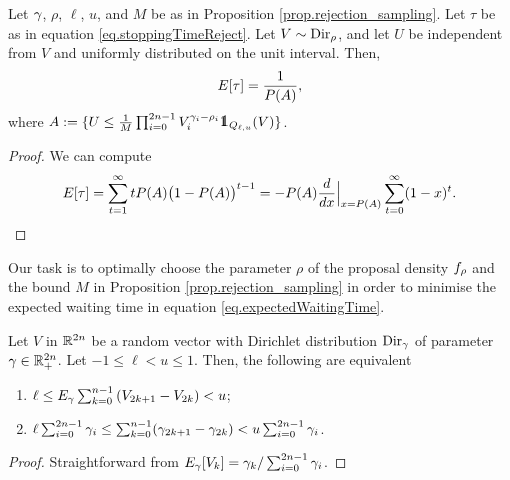 \documentclass[10pt, article,table]{article}
\begin{document}
\begin{prop}\label{prop.expectedWaitingTime}
 Let $\dirparam$, $\rho$, $\ell$, $u$, and $M$ be as in Proposition \ref{prop.rejection_sampling}. Let $\tau$ be as in equation \eqref{eq.stoppingTimeReject}.  Let $V\sim\dirichlet[\rho]$, and let $U$ be independent from $V$ and uniformly distributed on the unit interval.
 Then, 
 \begin{equation}\label{eq.expectedWaitingTime}
  \Expectation[\tau]
  =
  \frac{1}{\Prob(A)},
 \end{equation}
where $A:=\lbrace U\leq \frac{1}{M}\prod_{i=0}^{2n-1}V_{i}^{\dirparam_i - \rho_i}\one_{Q\subscriptellu}(V)\rbrace$.
\end{prop}
\begin{proof}
We can compute
 \begin{equation*}
  \Expectation[\tau]
  =
  \sum_{t=1}^{\infinity}t\Prob(A)\big(1-\Prob(A)\big)^{t-1}
  =
  -\Prob(A)\frac{d}{dx}\Big\vert_{x=\Prob(A)} \sum_{t=0}^{\infinity} (1-x)^{t}.
 \end{equation*}
\end{proof}

Our task is to optimally choose the parameter $\rho$  of the proposal density $\dirichletDensity[\rho]$  and the bound $M$ in Proposition \ref{prop.rejection_sampling} in order to minimise the expected waiting time in equation \eqref{eq.expectedWaitingTime}. 

\begin{lemma}\label{lemma.equivalence_expected_constraint}
 Let $V$ in $\R^{2n}$ be a random vector with Dirichlet distribution $\text{Dir}_{\dirparam}$ of parameter $\dirparam \in \R^{2n}_{+}$. Let  $-1\leq \ell < u \leq 1$. Then, the following are equivalent 
 \begin{enumerate}[label={\roman{*}.} , ref={\ref{lemma.equivalence_expected_constraint}.\roman{*}}]
  \item \label{lemma.equivalence_expected_constraint.expectation}$
  \ell \leq \Expectation_{\dirparam} \sum_{k=0}^{n-1} \left( V_{2k+1} - V_{2k} \right) < u $;
  \item \label{lemma.equivalence_expected_constraint.parameter} $\ell \sum_{i=0}^{2n-1}\dirparam_i 
  \leq 
  \sum_{k=0}^{n-1} (\dirparam_{2k+1} - \dirparam_{2k} ) 
  < u \sum_{i=0}^{2n-1}\dirparam_i
  $.
 \end{enumerate}
\end{lemma}
\begin{proof}
 Straightforward from $\Expectation_{\dirparam}[V_{k}] = \dirparam_{k}/\sum_{i=0}^{2n-1} \dirparam_{i}$.
\end{proof}
\end{document}
